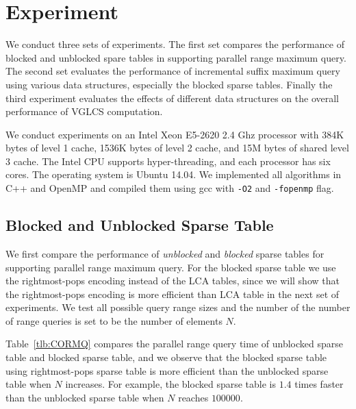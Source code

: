\section{Experiment} \label{sec:Experiment}

We conduct three sets of experiments.  The first set compares the
performance of blocked and unblocked spare tables in supporting
parallel range maximum query.  The second set evaluates the
performance of incremental suffix maximum query using various data
structures, especially the blocked sparse tables.  Finally the third
experiment evaluates the effects of different data structures on the
overall performance of VGLCS computation.

We conduct experiments on an Intel Xeon E5-2620 2.4 Ghz processor with
384K bytes of level 1 cache, 1536K bytes of level 2 cache, and 15M
bytes of shared level 3 cache.  The Intel CPU supports
hyper-threading, and each processor has six cores.  The operating
system is Ubuntu 14.04.  We implemented all algorithms in C++ and
OpenMP and compiled them using gcc with {\tt -O2} and {\tt -fopenmp}
flag.

\subsection{Blocked and Unblocked Sparse Table}

We first compare the performance of {\em unblocked} and {\em blocked}
sparse tables for supporting parallel range maximum query.  For the
blocked sparse table we use the rightmost-pops encoding instead of
the LCA tables, since we will show that the rightmost-pops encoding
is more efficient than LCA table in the next set of experiments.  We
test all possible query range sizes and the number of the number of
range queries is set to be the number of elements $N$.

Table~\ref{tlb:CORMQ} compares the parallel range query time of
unblocked sparse table and blocked sparse table, and we observe that
the blocked sparse table using rightmost-pops sparse table is more
efficient than the unblocked sparse table when $N$ increases.  For
example, the blocked sparse table is $1.4$ times faster than the
unblocked sparse table when $N$ reaches $100000$. 

